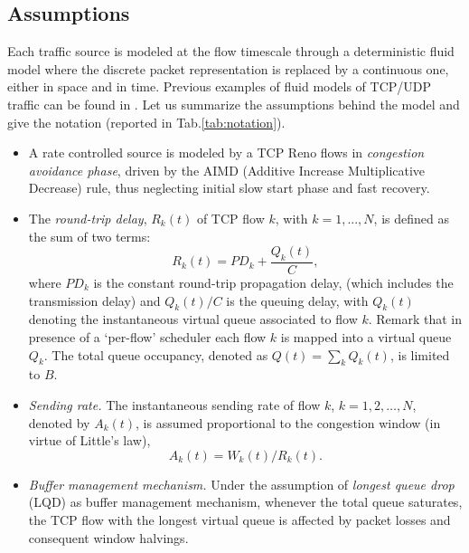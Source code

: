 \documentclass[a4paper,oneside, 11pt]{article}
\begin{document}
\subsection{Assumptions}\label{subsec:assumptions}
Each traffic source is modeled at the flow timescale through a  deterministic fluid model where the discrete packet
representation is replaced by a continuous one, either in space and in time.
Previous examples of fluid models of TCP/UDP traffic can be found in \cite{misra,ajmone,baccelli}.
Let us summarize the assumptions behind the model and give the notation (reported in Tab.\ref{tab:notation}).
\begin{itemize}
\item  A rate controlled source is modeled by a TCP Reno flows in \textit{congestion avoidance phase}, driven
by the AIMD (Additive Increase Multiplicative Decrease) rule, thus neglecting initial slow start phase and fast recovery.
\item  The \textit{round-trip delay}, $R_k(t)$ of TCP flow $k$, with  $k=1,...,N$, is defined as the sum of two terms:$$\label{eqn:RTT} R_k(t)= PD_k+\frac{Q_k(t)}{C},$$
where $PD_k$ is the constant round-trip propagation delay, (which includes the transmission delay) and $Q_k(t)/C$ is the queuing delay,
with $Q_k(t)$ denoting the instantaneous virtual queue associated to flow $k$.
Remark that in presence of a `per-flow' scheduler  each flow $k$ is mapped into a virtual queue $Q_k$. The total queue occupancy,
denoted as $Q(t)=\sum_k Q_k(t)$, is limited to $B$.
\item \textit{Sending rate.}  The
instantaneous sending rate of flow $k$, $k=1,2,\dots,N$, denoted by $A_k(t)$, is assumed proportional to the congestion window (in virtue of Little's law), $$A_k(t)=W_k(t)/R_k(t).$$
\item \textit{Buffer management mechanism.} Under the assumption of \textit{ longest queue drop}
(LQD) as buffer management mechanism, whenever the total queue saturates, the TCP flow with the longest
virtual queue is affected by  packet losses and consequent window halvings.
\end{itemize}
\end{document}
